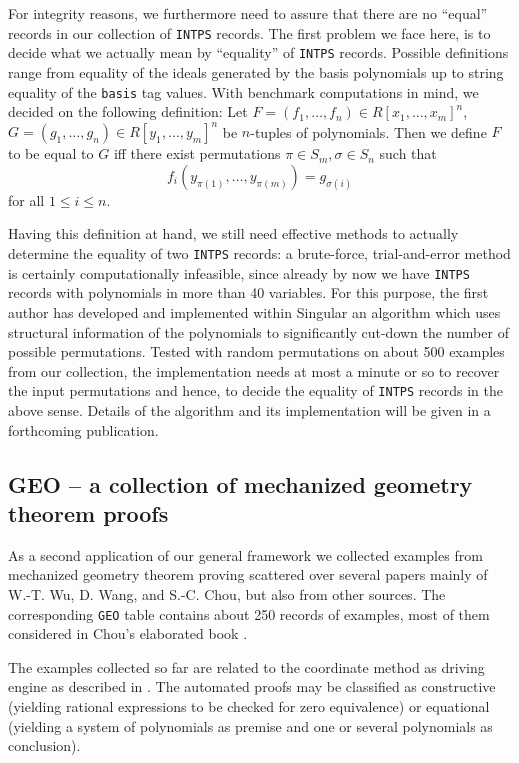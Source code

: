 \documentclass[11pt,a4paper]{article}
\begin{document}
For integrity reasons, we furthermore need to assure that there are no
``equal'' records in our collection of {\tt INTPS} records. The first
problem we face here, is to decide what we actually mean by
``equality'' of {\tt INTPS} records. Possible definitions range from
equality of the ideals generated by the basis polynomials up to string
equality of the {\tt basis} tag values. With benchmark computations in
mind, we decided on the following definition: Let $F=(f_1,\ldots, f_n)
\in R[x_1,\ldots,x_m]^n$, $G=(g_1,\ldots,g_n) \in R[y_1, \ldots,
y_m]^n$ be $n$-tuples of polynomials. Then we define $F$ to be equal
to $G$ iff there exist permutations $\pi \in S_m, \sigma \in S_n$ such
that 
\[f_i(y_{\pi(1)},\ldots,y_{\pi(m)}) = g_{\sigma(i)}\]
for all $1 \le i \le n$.

Having this definition at hand, we still need effective methods to
actually determine the equality of two {\tt INTPS} records: a
brute-force, trial-and-error method is certainly computationally
infeasible, since already by now we have {\tt INTPS} records with
polynomials in more than 40 variables. For this purpose, the first
author has developed and implemented within {\sc Singular} an
algorithm which uses structural information of the polynomials to
significantly cut-down the number of possible permutations. Tested
with random permutations on about 500 examples from our collection,
the implementation needs at most a minute or so to recover the input
permutations and hence, to decide the equality of {\tt INTPS} records
in the above sense. Details of the algorithm and its implementation
will be given in a forthcoming publication.


\subsection{GEO -- a collection of mechanized geometry theorem proofs}

As a second application of our general framework we collected examples
from mechanized geometry theorem proving scattered over several papers
mainly of W.-T. Wu, D. Wang, and S.-C. Chou, but also from other
sources. The corresponding {\tt GEO} table contains about 250 records
of examples, most of them considered in Chou's elaborated book
\cite{Chou_88a}.

The examples collected so far are related to the coordinate method as
driving engine as described in \cite{Chou_88a}. The automated proofs
may be classified as constructive (yielding rational expressions to be
checked for zero equivalence) or equational (yielding a system of
polynomials as premise and one or several polynomials as conclusion). 
\end{document}
